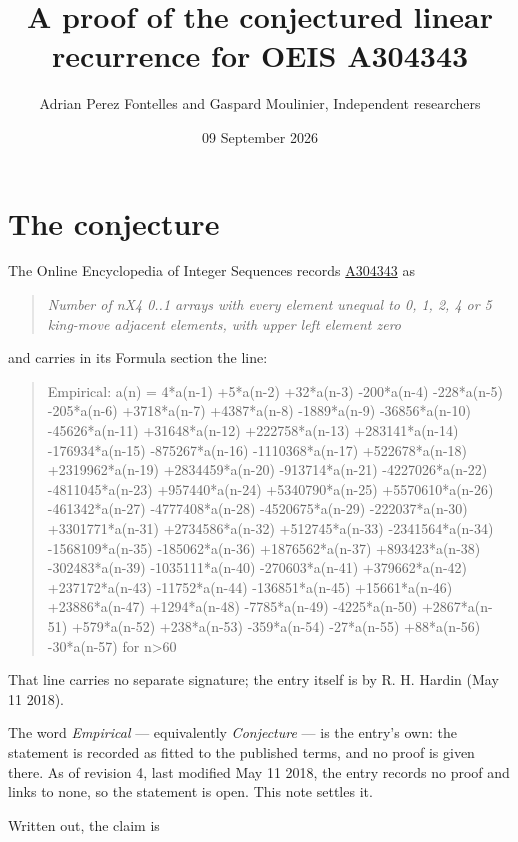 \documentclass[11pt]{article}
\title{A proof of the conjectured linear recurrence for OEIS A304343}
\author{Adrian Perez Fontelles and Gaspard Moulinier, Independent researchers}
\date{09 September 2026}
\theoremstyle{definition}
\begin{document}
\maketitle
\section{The conjecture}

The Online Encyclopedia of Integer Sequences records \href{https://oeis.org/A304343}{A304343} as

\begin{quote}\itshape Number of nX4 0..1 arrays with every element unequal to 0, 1, 2, 4 or 5 king-move adjacent elements, with upper left element zero\end{quote}

and carries in its Formula section the line:

\begin{quote}\ttfamily Empirical: a(n) = 4*a(n-1) +5*a(n-2) +32*a(n-3) -200*a(n-4) -228*a(n-5) -205*a(n-6) +3718*a(n-7) +4387*a(n-8) -1889*a(n-9) -36856*a(n-10) -45626*a(n-11) +31648*a(n-12) +222758*a(n-13) +283141*a(n-14) -176934*a(n-15) -875267*a(n-16) -1110368*a(n-17) +522678*a(n-18) +2319962*a(n-19) +2834459*a(n-20) -913714*a(n-21) -4227026*a(n-22) -4811045*a(n-23) +957440*a(n-24) +5340790*a(n-25) +5570610*a(n-26) -461342*a(n-27) -4777408*a(n-28) -4520675*a(n-29) -222037*a(n-30) +3301771*a(n-31) +2734586*a(n-32) +512745*a(n-33) -2341564*a(n-34) -1568109*a(n-35) -185062*a(n-36) +1876562*a(n-37) +893423*a(n-38) -302483*a(n-39) -1035111*a(n-40) -270603*a(n-41) +379662*a(n-42) +237172*a(n-43) -11752*a(n-44) -136851*a(n-45) +15661*a(n-46) +23886*a(n-47) +1294*a(n-48) -7785*a(n-49) -4225*a(n-50) +2867*a(n-51) +579*a(n-52) +238*a(n-53) -359*a(n-54) -27*a(n-55) +88*a(n-56) -30*a(n-57) for n>60\end{quote}

That line carries no separate signature; the entry itself is by R. H. Hardin (May 11 2018).

The word {\itshape Empirical} --- equivalently {\itshape Conjecture} --- is the entry's own: the statement is recorded as fitted to the published terms, and no proof is given there. As of revision 4, last modified May 11 2018, the entry records no proof and links to none, so the statement is open. This note settles it.

Written out, the claim is
\end{document}
